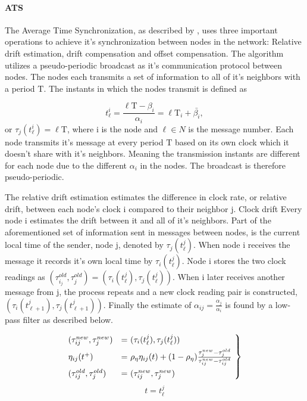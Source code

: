 \documentclass[a4paper,12pt]{article}
\begin{document}
    \paragraph{ATS} The Average Time Synchronization, as described by \citet{SchenatoFiorentin11}, uses three important operations to achieve it's synchronization between nodes in the network: Relative drift estimation, drift compensation and offset compensation. The algorithm utilizes a pseudo-periodic broadcast as it's communication protocol between nodes. The nodes each transmits a set of information to all of it's neighbors with a period $\mathrm{T}$. The instants in which the nodes transmit is defined as 
    
    \begin{equation}
        t^i_\ell = \frac{\ell\mathrm{T} - \beta_i}{\alpha_i} = \ell\mathrm{T}_i + \bar{\beta_i},
    \end{equation}
    or $\tau_j(t^i_\ell) = \ell\mathrm{T}$, where i is the node and $\ell \in N$ is the message number. Each node transmits it's message at every period $\mathrm{T}$ based on its own clock which it doesn't share with it's neighbors. Meaning the transmission instants are different for each node due to the different $\alpha_i$ in the nodes. The broadcast is therefore pseudo-periodic.
    
    
    The relative drift estimation estimates the difference in clock rate, or relative drift, between each node's clock i compared to their neighbor j. Clock drift  Every node i estimates the drift between it and all of it's neighbors. Part of the aforementioned set of information sent in messages between nodes, is the current local time of the sender, node j, denoted by $\tau_j(t^j_\ell)$. When node i receives the message it records it's own local time by $\tau_i(t^j_\ell)$. Node i stores the two clock readings as $(\tau^{old}_{i_j}, \tau^{old}_j) = (\tau_i(t^j_\ell), \tau_j(t^j_\ell))$. 
    When i later receives another message from j, the process repeats and a new clock reading pair is constructed, $(\tau_i(t^j_{\ell + 1}), \tau_j(t^j_{\ell + 1}))$. Finally the estimate of $\alpha_{ij} = \frac{\alpha_j}{\alpha_i}$ is found by a low-pass filter as described below.
    
    \begin{equation}
        \begin{rcases*}
            (\tau_{ij}^{new}, \tau_j^{new}) &= $(\tau_i(t^j_\ell), \tau_j(t^j_\ell))$ \\
            \eta_{ij}(t^+) &= $\rho_\eta\eta_{ij}(t) + (1 - \rho_\eta)\frac{\tau_j^{new} - \tau_j^{old}}{\tau_{ij}^{new} - \tau_{ij}^{old}} $ \\
            (\tau_{ij}^{old}, \tau_j^{old}) &= $(\tau_{ij}^{new}, \tau_j^{new})$
        \end{rcases*} \nonumber
    \end{equation}
    \begin{equation}
        t = t^j_\ell
    \end{equation}
    
\end{document}
